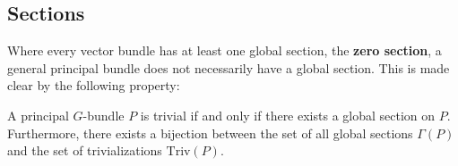 \subsection{Sections}
	Where every vector bundle has at least one global section, the \textbf{zero section}\footnotemark, a general principal bundle does not necessarily have a global section. This is made clear by the following property:
	\begin{property}
		A principal $G$-bundle $P$ is trivial if and only if there exists a global section on $P$. Furthermore, there exists a bijection between the set of all global sections $\Gamma(P)$ and the set of trivializations $\text{Triv}(P)$.
	\end{property}
